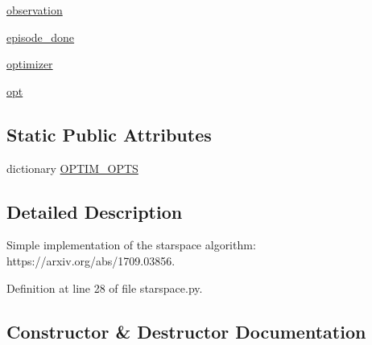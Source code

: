 \begin{DoxyCompactItemize}
\item 
\hyperlink{classparlai_1_1agents_1_1starspace_1_1starspace_1_1StarspaceAgent_a0ec7b24305a7ca5f0fd5a11cd6aa1fdc}{observation}
\item 
\hyperlink{classparlai_1_1agents_1_1starspace_1_1starspace_1_1StarspaceAgent_ad6565ef570b709afb46bf9a9b4bc59c3}{episode\+\_\+done}
\item 
\hyperlink{classparlai_1_1agents_1_1starspace_1_1starspace_1_1StarspaceAgent_afacbbd91785631f9b23fd0fbd9b4cc21}{optimizer}
\item 
\hyperlink{classparlai_1_1agents_1_1starspace_1_1starspace_1_1StarspaceAgent_aae476e9cdd8b9672ae6c28ef9400f09e}{opt}
\end{DoxyCompactItemize}
\subsection*{Static Public Attributes}
\begin{DoxyCompactItemize}
\item 
dictionary \hyperlink{classparlai_1_1agents_1_1starspace_1_1starspace_1_1StarspaceAgent_ab9c156709a8072a6cddf7216396f610a}{O\+P\+T\+I\+M\+\_\+\+O\+P\+TS}
\end{DoxyCompactItemize}


\subsection{Detailed Description}
\begin{DoxyVerb}Simple implementation of the starspace algorithm: https://arxiv.org/abs/1709.03856.
\end{DoxyVerb}
 

Definition at line 28 of file starspace.\+py.



\subsection{Constructor \& Destructor Documentation}
\mbox{\label{classparlai_1_1agents_1_1starspace_1_1starspace_1_1StarspaceAgent_a6bdc1142c021946ee6cb409d4f9dc3c9}} 
